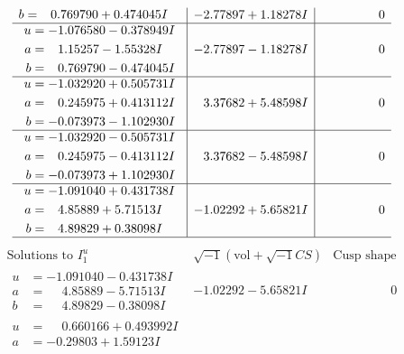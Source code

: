 \documentclass[1p]{elsarticle_modified}
\theoremstyle{definition}
\newcommand{\I}{\sqrt{-1}}
\begin{document}
$$\begin{array}{c|c|c}
\begin{aligned}
b &= \phantom{-}0.769790 + 0.474045 I\end{aligned}
 & -2.77897 + 1.18278 I & \phantom{-0.000000 } 0 \\ \hline\begin{aligned}
u &= -1.076580 - 0.378949 I \\
a &= \phantom{-}1.15257 - 1.55328 I \\
b &= \phantom{-}0.769790 - 0.474045 I\end{aligned}
 & -2.77897 - 1.18278 I & \phantom{-0.000000 } 0 \\ \hline\begin{aligned}
u &= -1.032920 + 0.505731 I \\
a &= \phantom{-}0.245975 + 0.413112 I \\
b &= -0.073973 - 1.102930 I\end{aligned}
 & \phantom{-}3.37682 + 5.48598 I & \phantom{-0.000000 } 0 \\ \hline\begin{aligned}
u &= -1.032920 - 0.505731 I \\
a &= \phantom{-}0.245975 - 0.413112 I \\
b &= -0.073973 + 1.102930 I\end{aligned}
 & \phantom{-}3.37682 - 5.48598 I & \phantom{-0.000000 } 0 \\ \hline\begin{aligned}
u &= -1.091040 + 0.431738 I \\
a &= \phantom{-}4.85889 + 5.71513 I \\
b &= \phantom{-}4.89829 + 0.38098 I\end{aligned}
 & -1.02292 + 5.65821 I & \phantom{-0.000000 } 0\\
 \hline 
 \end{array}$$\newpage$$\begin{array}{c|c|c}  
\text{Solutions to }I^u_{1}& \I (\text{vol} + \sqrt{-1}CS) & \text{Cusp shape}\\
 \hline 
\begin{aligned}
u &= -1.091040 - 0.431738 I \\
a &= \phantom{-}4.85889 - 5.71513 I \\
b &= \phantom{-}4.89829 - 0.38098 I\end{aligned}
 & -1.02292 - 5.65821 I & \phantom{-0.000000 } 0 \\ \hline\begin{aligned}
u &= \phantom{-}0.660166 + 0.493992 I \\
a &= -0.29803 + 1.59123 I \\

\end{aligned}
\end{array}$$
\end{document}
